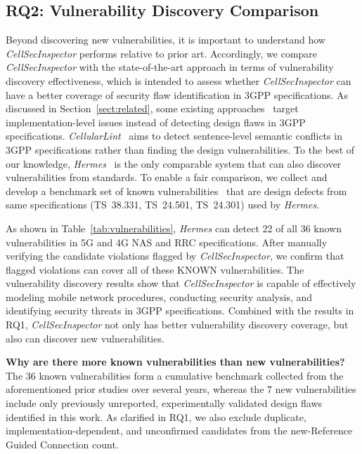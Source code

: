 \documentclass[sigconf]{acmart}
\newcommand{\lm}{\textit{CellSecInspector}\xspace}
\begin{document}
{\subsection{RQ2: Vulnerability Discovery Comparison}
Beyond discovering new vulnerabilities, it is important to understand how \lm performs relative to prior art. 
Accordingly, we compare \lm with the state-of-the-art approach in terms of vulnerability discovery effectiveness, which is intended to assess whether \lm can have a better coverage of security flaw identification in 3GPP specifications. As discussed in Section~\ref{sect:related}, some existing approaches~\cite{chen2021bookworm,chen2023sherlock,tan2025automated} target implementation-level issues instead of detecting design flaws in 3GPP specifications. \textit{CellularLint}~\cite{rahman2024cellularlint} aims to detect sentence-level semantic conflicts in 3GPP specifications rather than finding the design vulnerabilities.  
To the best of our knowledge, \textit{Hermes}~\cite{al2024hermes} is the only comparable system that can also discover vulnerabilities from standards. To enable a fair comparison, we collect and develop a benchmark set of known vulnerabilities~\cite{shaik2015practical, 6550445, kambourakis2011attacks, lee2009detection, leong2014unveiling, kim2019touching, van2015defeating, park2016white, chlosta2019lte, 8958725, michau2016not, hussain20195greasoner, borgaonkar2018new, 8894379, chlosta20215g, hussain2019privacy, al2024hermes, hussain2018lteinspector} that are design defects from same specifications (TS~38.331, TS~24.501, TS~24.301) used by \textit{Hermes}.



As shown in Table~\ref{tab:vulnerabilities}, \textit{Hermes} can detect 22 of all 36 known vulnerabilities in 5G and 4G NAS and RRC specifications. 
After manually verifying the candidate violations flagged by \lm, we confirm that flagged violations can cover all of these KNOWN vulnerabilities.
The vulnerability discovery results show that \lm is capable of effectively modeling mobile network procedures, conducting security analysis, and identifying security threats in 3GPP specifications. Combined with the results in RQ1, \lm not only has better vulnerability discovery coverage, but also can discover new vulnerabilities. 

\noindent \textbf{Why are there more known vulnerabilities than new vulnerabilities?}
The 36 known vulnerabilities form a cumulative benchmark collected from the aforementioned prior studies over several years, whereas the 7 new vulnerabilities include only previously unreported, experimentally validated design flaws identified in this work. As clarified in RQ1, we also exclude duplicate, implementation-dependent, and unconfirmed candidates from the new-Reference Guided Connection count. 


}
\end{document}
